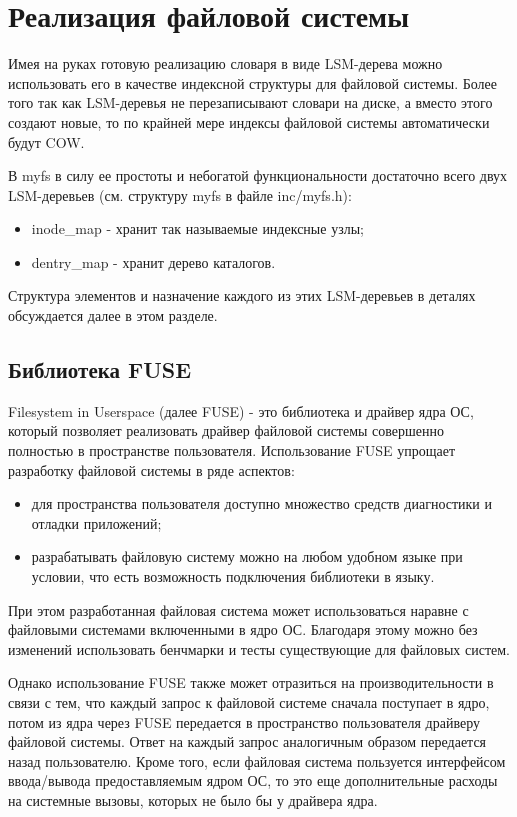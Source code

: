 \section{Реализация файловой системы}

Имея на руках готовую реализацию словаря в виде LSM-дерева можно использовать
его в качестве индексной структуры для файловой системы. Более того так как
LSM-деревья не перезаписывают словари на диске, а вместо этого создают новые, то
по крайней мере индексы файловой системы автоматически будут COW.

В myfs в силу ее простоты и небогатой функциональности достаточно всего двух
LSM-деревьев (см. структуру myfs в файле inc/myfs.h):
\begin{itemize}
  \item inode\_map - хранит так называемые индексные узлы;
  \item dentry\_map - хранит дерево каталогов.
\end{itemize}
Структура элементов и назначение каждого из этих LSM-деревьев в деталях
обсуждается далее в этом разделе.


\subsection{Библиотека FUSE}

Filesystem in Userspace (далее FUSE) - это библиотека и драйвер ядра ОС, который
позволяет реализовать драйвер файловой системы совершенно полностью в
пространстве пользователя. Использование FUSE упрощает разработку файловой
системы в ряде аспектов:
\begin{itemize}
  \item для пространства пользователя доступно множество средств диагностики и
        отладки приложений;
  \item разрабатывать файловую систему можно на любом удобном языке при условии,
        что есть возможность подключения библиотеки в языку.
\end{itemize}

При этом разработанная файловая система может использоваться наравне с файловыми
системами включенными в ядро ОС. Благодаря этому можно без изменений
использовать бенчмарки и тесты существующие для файловых систем.

Однако использование FUSE также может отразиться на производительности в связи
с тем, что каждый запрос к файловой системе сначала поступает в ядро, потом из
ядра через FUSE передается в пространство пользователя драйверу файловой
системы. Ответ на каждый запрос аналогичным образом передается назад
пользователю. Кроме того, если файловая система пользуется интерфейсом
ввода/вывода предоставляемым ядром ОС, то это еще дополнительные расходы на
системные вызовы, которых не было бы у драйвера ядра.


